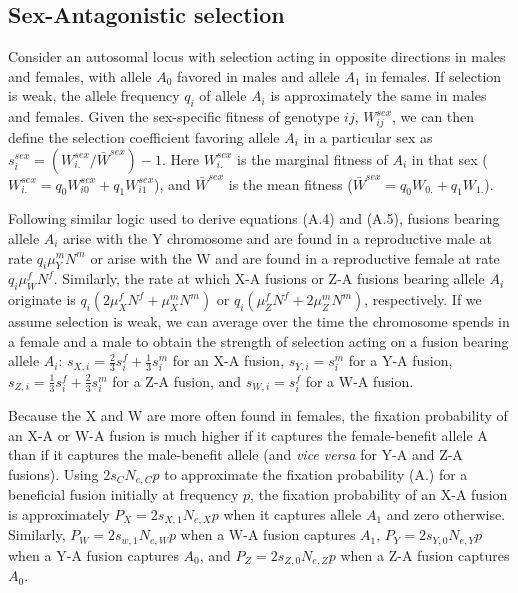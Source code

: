 \documentclass[12pt,twoside]{article}
\begin{document}
\subsection{Sex-Antagonistic selection}
Consider an autosomal locus with selection acting in opposite directions in males and females, with allele $A_0$ favored in males and allele $A_\text{1}$ in females. If selection is weak, the allele frequency $q_i$ of allele $A_i$ is approximately the same in males and females. Given the sex-specific fitness of genotype $ij$, $W^{sex}_{ij}$, we can then define the selection coefficient favoring allele $A_i$ in a particular sex as $s^{sex}_i=(W^{sex}_{i.}/\bar{W}^{sex})-\text{1}$. Here $W^{sex}_{i.}$ is the marginal fitness of $A_i$ in that sex ($W^{sex}_{i.}=q_0W^{sex}_{i0} + q_\text{1}W^{sex}_{i\text{1}}$), and $\bar{W}^{sex}$ is the mean fitness ($\bar{W}^{sex} = q_0W_{0.} + q_1W_{1.}$).

Following similar logic used to derive equations (A.4) and (A.5), fusions bearing allele $A_i$ arise with the Y chromosome and are found in a reproductive male at rate $q_i\mu^m_YN^m$  or arise with the W and are found in a reproductive female at rate $q_i\mu^f_WN^f$. Similarly, the rate at which X-A fusions or Z-A fusions bearing allele $A_i$ originate is $q_i(\text{2}\mu^f_XN^f + \mu^m_XN^m)$ or $q_i(\mu^f_ZN^f + \text{2}\mu^m_ZN^m)$, respectively. If we assume selection is weak, we can average over the time the chromosome spends in a female and a male to obtain the strength of selection acting on a fusion bearing allele $A_i$: $s_{X,i}=\frac{\text{2}}{\text{3}}s^f_i + \frac{\text{1}}{\text{3}}s^m_i$ for an X-A fusion, $s_{Y,i}=s^m_i$ for a Y-A fusion, $s_{Z,i}=\frac{\text{1}}{\text{3}}s^f_i + \frac{\text{2}}{\text{3}}s^m_i$  for a Z-A fusion, and $s_{W,i}=s^f_i$ for a W-A fusion.
 
Because the X and W are more often found in females, the fixation probability of an X-A or W-A fusion is much higher if it captures the female-benefit allele A than if it captures the male-benefit allele (and \emph{vice versa} for Y-A and Z-A fusions). Using $\text{2}s_CN_{e,C}p$ to approximate the fixation probability (A.) for a beneficial fusion initially at frequency $p$, the fixation probability of an X-A fusion is approximately $P_{X}=\text{2}s_{X,\text{1}}N_{e,X}p$ when it captures allele $A_\text{1}$ and zero otherwise. Similarly, $P_W = \text{2}s_{w,\text{1}}N_{e,W}p$ when a W-A fusion captures $A_\text{1}$, $P_Y = \text{2}s_{Y,0}N_{e,Y}p$ when a Y-A fusion captures $A_0$, and $P_Z=\text{2}s_{Z,0}N_{e,Z}p$ when a Z-A fusion captures $A_0$.
\end{document}
